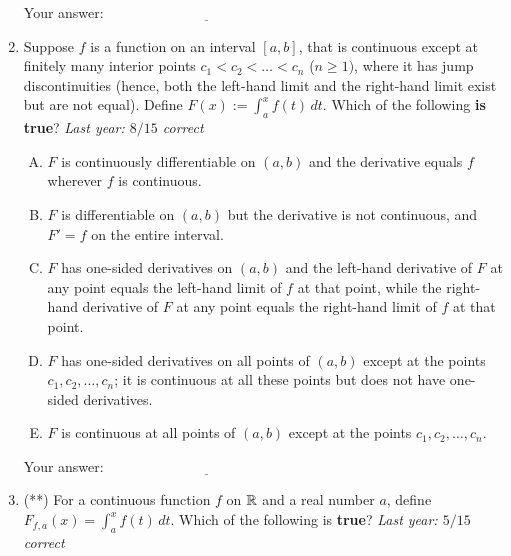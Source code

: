 \documentclass[10pt]{amsart}
\begin{document}
\begin{enumerate}
  \vspace{0.1in}
  Your answer: $\underline{\qquad\qquad\qquad\qquad\qquad\qquad\qquad}$
  \vspace{1in}

\item Suppose $f$ is a function on an interval $[a,b]$, that is
  continuous except at finitely many interior points $c_1 < c_2 <
  \dots < c_n$ ($n \ge 1)$, where it has jump discontinuities (hence,
  both the left-hand limit and the right-hand limit exist but are not
  equal). Define $F(x) := \int_a^x f(t) \, dt$. Which of the following
  {\bf is true}? {\em Last year: $8/15$ correct}

  \begin{enumerate}[(A)]
  \item $F$ is continuously differentiable on $(a,b)$ and the
    derivative equals $f$ wherever $f$ is continuous.
  \item $F$ is differentiable on $(a,b)$ but the derivative is not
    continuous, and $F' = f$ on the entire interval.
  \item $F$ has one-sided derivatives on $(a,b)$ and the left-hand
    derivative of $F$ at any point equals the left-hand limit of $f$
    at that point, while the right-hand derivative of $F$ at any point
    equals the right-hand limit of $f$ at that point.
  \item $F$ has one-sided derivatives on all points of $(a,b)$ except
    at the points $c_1, c_2, \dots, c_n$; it is continuous at all
    these points but does not have one-sided derivatives.
  \item $F$ is continuous at all points of $(a,b)$ except at the
  points $c_1, c_2, \dots, c_n$.
  \end{enumerate}

  \vspace{0.1in}
  Your answer: $\underline{\qquad\qquad\qquad\qquad\qquad\qquad\qquad}$
  \vspace{1in}

\item (**) For a continuous function $f$ on $\mathbb{R}$ and a real number $a$,
  define $F_{f,a}(x) = \int_a^x f(t) \, dt$. Which of the following
  is {\bf true}? {\em Last year: $5/15$ correct}


\end{enumerate}
\end{document}
